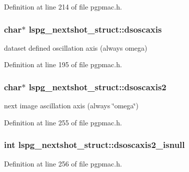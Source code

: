 Definition at line 214 of file pgpmac.\-h.

\hypertarget{structlspg__nextshot__struct_a9a62c304e66013e8e5e5618a44f0b6d4}{
\subsubsection[{dsoscaxis}]{\setlength{\rightskip}{0pt plus 5cm}char$\ast$ lspg\-\_\-nextshot\-\_\-struct\-::dsoscaxis}}\label{structlspg__nextshot__struct_a9a62c304e66013e8e5e5618a44f0b6d4}


dataset defined oscillation axis (always omega) 



Definition at line 195 of file pgpmac.\-h.

\hypertarget{structlspg__nextshot__struct_ac86005a6e90ff502da9e95b59d0b7a5f}{
\subsubsection[{dsoscaxis2}]{\setlength{\rightskip}{0pt plus 5cm}char$\ast$ lspg\-\_\-nextshot\-\_\-struct\-::dsoscaxis2}}\label{structlspg__nextshot__struct_ac86005a6e90ff502da9e95b59d0b7a5f}


next image ascillation axis (always \char`\"{}omega\char`\"{}) 



Definition at line 255 of file pgpmac.\-h.

\hypertarget{structlspg__nextshot__struct_a98e280e99ae847559bb82836df3c32d1}{
\subsubsection[{dsoscaxis2\-\_\-isnull}]{\setlength{\rightskip}{0pt plus 5cm}int lspg\-\_\-nextshot\-\_\-struct\-::dsoscaxis2\-\_\-isnull}}\label{structlspg__nextshot__struct_a98e280e99ae847559bb82836df3c32d1}


Definition at line 256 of file pgpmac.\-h.

